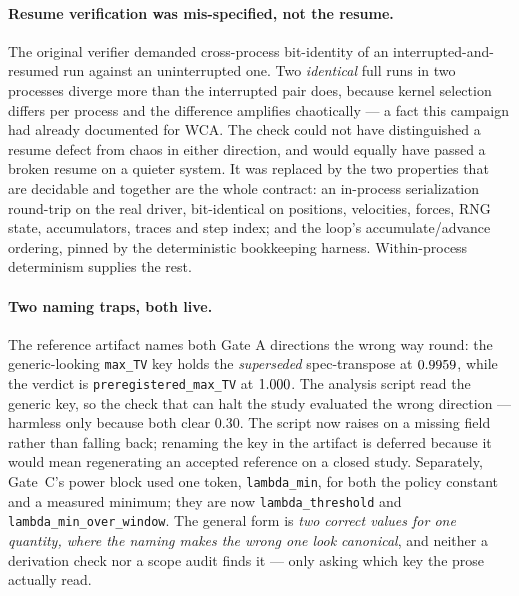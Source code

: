 \paragraph*{Resume verification was mis-specified, not the resume.} The original verifier demanded
cross-process bit-identity of an interrupted-and-resumed run against an uninterrupted one. Two
\emph{identical} full runs in two processes diverge more than the interrupted pair does, because
kernel selection differs per process and the difference amplifies chaotically --- a fact this
campaign had already documented for WCA. The check could not have distinguished a resume defect
from chaos in either direction, and would equally have passed a broken resume on a quieter
system. It was replaced by the two properties that are decidable and together are the whole
contract: an in-process serialization round-trip on the real driver, bit-identical on positions,
velocities, forces, RNG state, accumulators, traces and step index; and the loop's
accumulate/advance ordering, pinned by the deterministic bookkeeping harness. Within-process
determinism supplies the rest.

\paragraph*{Two naming traps, both live.} The reference artifact names both Gate A directions the
wrong way round: the generic-looking \texttt{max\_TV} key holds the \emph{superseded}
spec-transpose at $0.9959$, while the verdict is \texttt{preregistered\_max\_TV} at
$1.000$. The analysis script read the generic key, so the check that can halt the study
evaluated the wrong direction --- harmless only because both clear $0.30$. The script now raises
on a missing field rather than falling back; renaming the key in the artifact is deferred because
it would mean regenerating an accepted reference on a closed study. Separately, Gate~C's power
block used one token, \texttt{lambda\_min}, for both the policy constant and a measured minimum;
they are now \texttt{lambda\_threshold} and \texttt{lambda\_min\_over\_window}. The general form
is \emph{two correct values for one quantity, where the naming makes the wrong one look
canonical}, and neither a derivation check nor a scope audit finds it --- only asking which key
the prose actually read.

